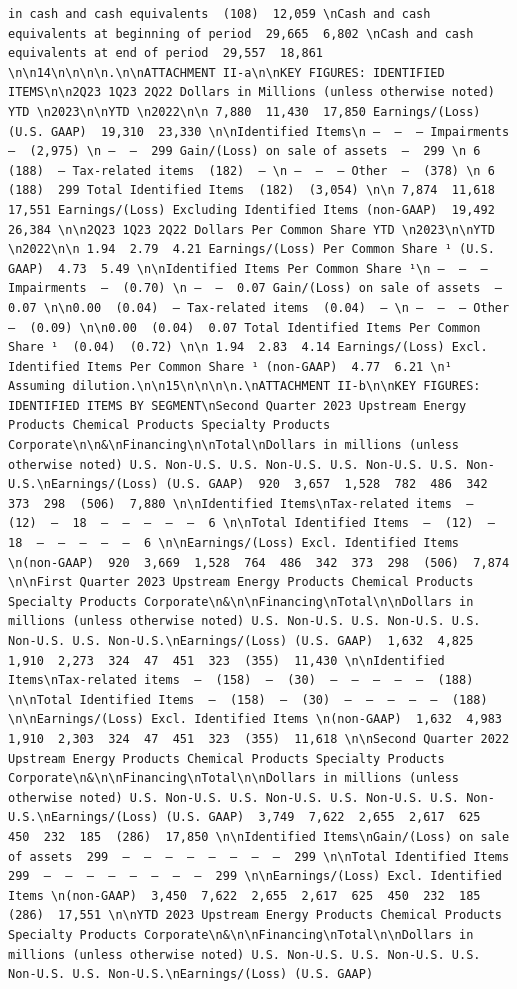 \documentclass[
  letterpaper,
  DIV=11,
  numbers=noendperiod]{scrreprt}
\begin{document}
\begin{verbatim}
in cash and cash equivalents  (108)  12,059 \nCash and cash equivalents at beginning of period  29,665  6,802 \nCash and cash equivalents at end of period  29,557  18,861 \n\n14\n\n\n\n.\n\nATTACHMENT II-a\n\nKEY FIGURES: IDENTIFIED ITEMS\n\n2Q23 1Q23 2Q22 Dollars in Millions (unless otherwise noted) YTD \n2023\n\nYTD \n2022\n\n 7,880  11,430  17,850 Earnings/(Loss) (U.S. GAAP)  19,310  23,330 \n\nIdentified Items\n —  —  — Impairments  —  (2,975) \n —  —  299 Gain/(Loss) on sale of assets  —  299 \n 6  (188)  — Tax-related items  (182)  — \n —  —  — Other  —  (378) \n 6  (188)  299 Total Identified Items  (182)  (3,054) \n\n 7,874  11,618  17,551 Earnings/(Loss) Excluding Identified Items (non-GAAP)  19,492  26,384 \n\n2Q23 1Q23 2Q22 Dollars Per Common Share YTD \n2023\n\nYTD \n2022\n\n 1.94  2.79  4.21 Earnings/(Loss) Per Common Share ¹ (U.S. GAAP)  4.73  5.49 \n\nIdentified Items Per Common Share ¹\n —  —  — Impairments  —  (0.70) \n —  —  0.07 Gain/(Loss) on sale of assets  —  0.07 \n\n0.00  (0.04)  — Tax-related items  (0.04)  — \n —  —  — Other  —  (0.09) \n\n0.00  (0.04)  0.07 Total Identified Items Per Common Share ¹  (0.04)  (0.72) \n\n 1.94  2.83  4.14 Earnings/(Loss) Excl. Identified Items Per Common Share ¹ (non-GAAP)  4.77  6.21 \n¹ Assuming dilution.\n\n15\n\n\n\n.\nATTACHMENT II-b\n\nKEY FIGURES: IDENTIFIED ITEMS BY SEGMENT\nSecond Quarter 2023 Upstream Energy Products Chemical Products Specialty Products Corporate\n\n&\nFinancing\n\nTotal\nDollars in millions (unless otherwise noted) U.S. Non-U.S. U.S. Non-U.S. U.S. Non-U.S. U.S. Non-U.S.\nEarnings/(Loss) (U.S. GAAP)  920  3,657  1,528  782  486  342  373  298  (506)  7,880 \n\nIdentified Items\nTax-related items  —  (12)  —  18  —  —  —  —  —  6 \n\nTotal Identified Items  —  (12)  —  18  —  —  —  —  —  6 \n\nEarnings/(Loss) Excl. Identified Items \n(non-GAAP)  920  3,669  1,528  764  486  342  373  298  (506)  7,874 \n\nFirst Quarter 2023 Upstream Energy Products Chemical Products Specialty Products Corporate\n&\n\nFinancing\nTotal\n\nDollars in millions (unless otherwise noted) U.S. Non-U.S. U.S. Non-U.S. U.S. Non-U.S. U.S. Non-U.S.\nEarnings/(Loss) (U.S. GAAP)  1,632  4,825  1,910  2,273  324  47  451  323  (355)  11,430 \n\nIdentified Items\nTax-related items  —  (158)  —  (30)  —  —  —  —  —  (188) \n\nTotal Identified Items  —  (158)  —  (30)  —  —  —  —  —  (188) \n\nEarnings/(Loss) Excl. Identified Items \n(non-GAAP)  1,632  4,983  1,910  2,303  324  47  451  323  (355)  11,618 \n\nSecond Quarter 2022 Upstream Energy Products Chemical Products Specialty Products Corporate\n&\n\nFinancing\nTotal\n\nDollars in millions (unless otherwise noted) U.S. Non-U.S. U.S. Non-U.S. U.S. Non-U.S. U.S. Non-U.S.\nEarnings/(Loss) (U.S. GAAP)  3,749  7,622  2,655  2,617  625  450  232  185  (286)  17,850 \n\nIdentified Items\nGain/(Loss) on sale of assets  299  —  —  —  —  —  —  —  —  299 \n\nTotal Identified Items  299  —  —  —  —  —  —  —  —  299 \n\nEarnings/(Loss) Excl. Identified Items \n(non-GAAP)  3,450  7,622  2,655  2,617  625  450  232  185  (286)  17,551 \n\nYTD 2023 Upstream Energy Products Chemical Products Specialty Products Corporate\n&\n\nFinancing\nTotal\n\nDollars in millions (unless otherwise noted) U.S. Non-U.S. U.S. Non-U.S. U.S. Non-U.S. U.S. Non-U.S.\nEarnings/(Loss) (U.S. GAAP) 
\end{verbatim}
\end{document}
